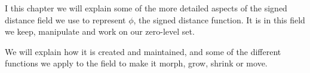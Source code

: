 I this chapter we will explain some of the more detailed aspects of
the signed distance field we use to represent $\phi$, the signed
distance function. It is in this field we keep, manipulate and work on
our zero-level set. 

We will explain how it is created and maintained, and some of the
different functions we apply to the field to make it morph, grow,
shrink or move.

